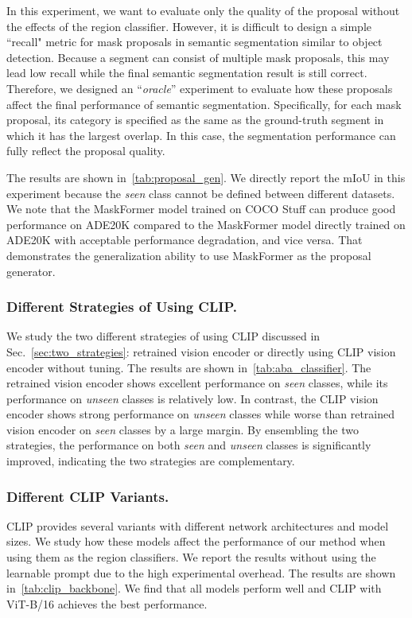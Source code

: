 \documentclass[runningheads]{llncs}
\begin{document}
In this experiment, we want to evaluate only the quality of the proposal without the effects of the region classifier. However, it is difficult to design a simple ``recall" metric for mask proposals in semantic segmentation similar to object detection. Because a segment can consist of multiple mask proposals, this may lead low recall while the final semantic segmentation result is still correct. Therefore, we designed an ``\textit{oracle}'' experiment to evaluate how these proposals affect the final performance of semantic segmentation. Specifically, for each mask proposal, its category is specified as the same as the ground-truth segment in which it has the largest overlap. In this case, the segmentation performance can fully reflect the proposal quality. 

The results are shown in~\cref{tab:proposal_gen}. We directly report the mIoU in this experiment because the \emph{seen} class cannot be defined between different datasets. We note that the MaskFormer model trained on COCO Stuff can produce good performance on ADE20K compared to the MaskFormer model directly trained on ADE20K with acceptable performance degradation, and vice versa. That demonstrates the generalization ability to use MaskFormer as the proposal generator.


\subsubsection{Different Strategies of Using CLIP.}
We study the two different strategies of using CLIP discussed in Sec.~\ref{sec:two_strategies}: retrained vision encoder or directly using CLIP vision encoder without tuning. The results are shown in~\cref{tab:aba_classifier}. The retrained vision encoder shows excellent performance on \emph{seen} classes, while its performance on \emph{unseen} classes is relatively low. In contrast, the CLIP vision encoder shows strong performance on \emph{unseen} classes while worse than retrained vision encoder on \emph{seen} classes by a large margin. By ensembling the two strategies, the performance on both \emph{seen} and \emph{unseen} classes is significantly improved, indicating the two strategies are complementary.

\subsubsection{Different CLIP Variants.} 
CLIP provides several variants with different network architectures and model sizes. We study how these models affect the performance of our method when using them as the region classifiers. We report the results without using the learnable prompt due to the high experimental overhead. The results are shown in~\cref{tab:clip_backbone}. We find that all models perform well and CLIP with ViT-B/16 achieves the best performance. 
\end{document}
